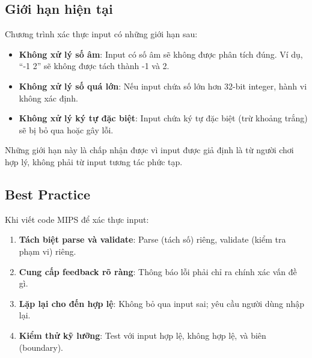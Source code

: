 \subsection{Giới hạn hiện tại}

Chương trình xác thực input có những giới hạn sau:

\begin{itemize}
    \item \textbf{Không xử lý số âm}: Input có số âm sẽ không được phân tích đúng. Ví dụ, ``-1 2'' sẽ không được tách thành -1 và 2.
    \item \textbf{Không xử lý số quá lớn}: Nếu input chứa số lớn hơn 32-bit integer, hành vi không xác định.
    \item \textbf{Không xử lý ký tự đặc biệt}: Input chứa ký tự đặc biệt (trừ khoảng trắng) sẽ bị bỏ qua hoặc gây lỗi.
\end{itemize}

Những giới hạn này là chấp nhận được vì input được giả định là từ người chơi hợp lý, không phải từ input tương tác phức tạp.

\subsection{Best Practice}

Khi viết code MIPS để xác thực input:

\begin{enumerate}
    \item \textbf{Tách biệt parse và validate}: Parse (tách số) riêng, validate (kiểm tra phạm vi) riêng.
    \item \textbf{Cung cấp feedback rõ ràng}: Thông báo lỗi phải chỉ ra chính xác vấn đề gì.
    \item \textbf{Lặp lại cho đến hợp lệ}: Không bỏ qua input sai; yêu cầu người dùng nhập lại.
    \item \textbf{Kiểm thử kỹ lưỡng}: Test với input hợp lệ, không hợp lệ, và biên (boundary).
\end{enumerate}
